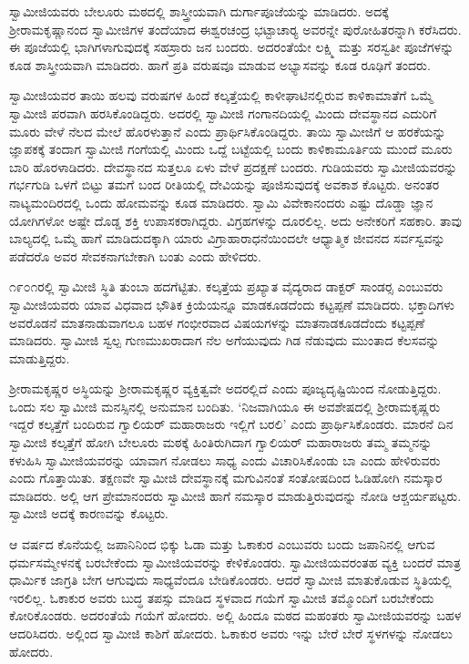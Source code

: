  ಸ್ವಾಮೀಜಿಯವರು ಬೇಲೂರು ಮಠದಲ್ಲಿ ಶಾಸ್ತ್ರೀಯವಾಗಿ ದುರ್ಗಾಪೂಜೆಯನ್ನು ಮಾಡಿದರು. ಅದಕ್ಕೆ ಶ‍್ರೀರಾಮಕೃಷ್ಣಾನಂದ ಸ್ವಾಮೀಜಿಗಳ ತಂದೆಯಾದ ಈಶ್ವರಚಂದ್ರ ಭಟ್ಟಾಚಾರ‍್ಯ ಅವರನ್ನೇ ಪುರೋಹಿತರನ್ನಾಗಿ ಕರೆಸಿದರು. ಈ ಪೂಜೆಯಲ್ಲಿ ಭಾಗಿಗಳಾಗುವುದಕ್ಕೆ ಸಹಸ್ರಾರು ಜನ ಬಂದರು. ಅದರಂತೆಯೇ ಲಕ್ಷ್ಮಿ ಮತ್ತು ಸರಸ್ವತೀ ಪೂಜೆಗಳನ್ನು ಕೂಡ ಶಾಸ್ತ್ರೀಯವಾಗಿ ಮಾಡಿದರು. ಹಾಗೆ ಪ್ರತಿ ವರುಷವೂ ಮಾಡುವ ಅಭ್ಯಾಸವನ್ನು ಕೂಡ ರೂಢಿಗೆ ತಂದರು. 

 ಸ್ವಾಮೀಜಿಯವರ ತಾಯಿ ಹಲವು ವರುಷಗಳ ಹಿಂದೆ ಕಲ್ಕತ್ತೆಯಲ್ಲಿ ಕಾಳೀಘಾಟಿನಲ್ಲಿರುವ ಕಾಳಿಕಾಮಾತೆಗೆ ಒಮ್ಮೆ ಸ್ವಾಮೀಜಿ ಪರವಾಗಿ ಹರಸಿಕೊಂಡಿದ್ದರು. ಅದರಲ್ಲಿ ಸ್ವಾಮೀಜಿ ಗಂಗಾನದಿಯಲ್ಲಿ ಮಿಂದು ದೇವಸ್ಥಾನದ ಎದುರಿಗೆ ಮೂರು ವೇಳೆ ನೆಲದ ಮೇಲೆ ಹೊರಳುತ್ತಾನೆ ಎಂದು ಪ್ರಾರ್ಥಿಸಿಕೊಂಡಿದ್ದರು. ತಾಯಿ ಸ್ವಾಮೀಜಿಗೆ ಆ ಹರಕೆಯನ್ನು ಜ್ಞಾಪಕಕ್ಕೆ ತಂದಾಗ ಸ್ವಾಮೀಜಿ ಗಂಗೆಯಲ್ಲಿ ಮಿಂದು ಒದ್ದೆ ಬಟ್ಟೆಯಲ್ಲಿ ಬಂದು ಕಾಳಿಕಾಮೂರ್ತಿಯ ಮುಂದೆ ಮೂರು ಬಾರಿ ಹೊರಳಾಡಿದರು. ದೇವಸ್ಥಾನದ ಸುತ್ತಲೂ ಏಳು ವೇಳೆ ಪ್ರದಕ್ಷಣೆ ಬಂದರು. ಗುಡಿಯವರು ಸ್ವಾಮೀಜಿಯವರನ್ನು ಗರ್ಭಗುಡಿ ಒಳಗೆ ಬಿಟ್ಟು ತಮಗೆ ಬಂದ ರೀತಿಯಲ್ಲಿ ದೇವಿಯನ್ನು ಪೂಜಿಸುವುದಕ್ಕೆ ಅವಕಾಶ ಕೊಟ್ಟರು. ಅನಂತರ ನಾಟ್ಯಮಂದಿರದಲ್ಲಿ ಒಂದು ಹೋಮವನ್ನು ಕೂಡ ಮಾಡಿದರು. ಸ್ವಾಮಿ ವಿವೇಕಾನಂದರು ಎಷ್ಟು ದೊಡ್ಡಾ ಜ್ಞಾನ ಯೋಗಿಗಳೋ ಅಷ್ಟೇ ದೊಡ್ಡ ಶಕ್ತಿ ಉಪಾಸಕರಾಗಿದ್ದರು. ವಿಗ್ರಹಗಳನ್ನು ದೂರಲಿಲ್ಲ. ಅದು ಅನೇಕರಿಗೆ ಸಹಕಾರಿ. ತಾವು ಬಾಲ್ಯದಲ್ಲಿ ಒಮ್ಮೆ ಹಾಗೆ ಮಾಡಿದುದಕ್ಕಾಗಿ ಯಾರು ವಿಗ್ರಾಹಾರಾಧನೆಯಿಂದಲೇ ಆಧ್ಯಾತ್ಮಿಕ ಜೀವನದ ಸರ್ವಸ್ವವನ್ನು ಪಡೆದರೊ ಅವರ ಸೇವಕನಾಗಬೇಕಾಗಿ ಬಂತು ಎಂದು ಹೇಳಿದರು. 

 ೧೯೦೧ರಲ್ಲಿ ಸ್ವಾಮೀಜಿ ಸ್ಥಿತಿ ತುಂಬಾ ಹದಗೆಟ್ಟಿತು. ಕಲ್ಕತ್ತೆಯ ಪ್ರಖ್ಯಾತ ವೈದ್ಯರಾದ ಡಾಕ್ಟರ್ ಸಾಂಡರ‍್ಸ ಎಂಬುವರು ಸ್ವಾಮೀಜಿಯವರು ಯಾವ ವಿಧವಾದ ಭೌತಿಕ ಕ್ರಿಯೆಯನ್ನೂ ಮಾಡಕೂಡದೆಂದು ಕಟ್ಟಪ್ಪಣೆ ಮಾಡಿದರು. ಭಕ್ತಾದಿಗಳು ಅವರೊಡನೆ ಮಾತನಾಡುವಾಗಲೂ ಬಹಳ ಗಂಭೀರವಾದ ವಿಷಯಗಳನ್ನು ಮಾತನಾಡಕೂಡದೆಂದು ಕಟ್ಟಪ್ಪಣೆ ಮಾಡಿದರು. ಸ್ವಾಮೀಜಿ ಸ್ವಲ್ಪ ಗುಣಮುಖರಾದಾಗ ನೆಲ ಅಗೆಯುವುದು ಗಿಡ ನೆಡುವುದು ಮುಂತಾದ ಕೆಲಸವನ್ನು ಮಾಡುತ್ತಿದ್ದರು. 

 ಶ‍್ರೀರಾಮಕೃಷ್ಣರ ಅಸ್ಥಿಯನ್ನು ಶ‍್ರೀರಾಮಕೃಷ್ಣರ ವ್ಯಕ್ತಿತ್ವವೇ ಅದರಲ್ಲಿದೆ ಎಂದು ಪೂಜ್ಯದೃಷ್ಟಿಯಿಂದ ನೋಡುತ್ತಿದ್ದರು. ಒಂದು ಸಲ ಸ್ವಾಮೀಜಿ ಮನಸ್ಸಿನಲ್ಲಿ ಅನುಮಾನ ಬಂದಿತು. ‘ನಿಜವಾಗಿಯೂ ಈ ಅವಶೇಷದಲ್ಲಿ ಶ‍್ರೀರಾಮಕೃಷ್ಣರು ಇದ್ದರೆ ಕಲ್ಕತ್ತೆಗೆ ಬಂದಿರುವ ಗ್ವಾಲಿಯರ್ ಮಹಾರಾಜರು ಇಲ್ಲಿಗೆ ಬರಲಿ’ ಎಂದು ಪ್ರಾರ್ಥಿಸಿಕೊಂಡರು. ಮಾರನೆ ದಿನ ಸ್ವಾಮೀಜಿ ಕಲ್ಕತ್ತೆಗೆ ಹೋಗಿ ಬೇಲೂರು ಮಠಕ್ಕೆ ಹಿಂತಿರುಗಿದಾಗ ಗ್ವಾಲಿಯರ್ ಮಹಾರಾಜರು ತಮ್ಮ ತಮ್ಮನನ್ನು ಕಳುಹಿಸಿ ಸ್ವಾಮೀಜಿಯವರನ್ನು ಯಾವಾಗ ನೋಡಲು ಸಾಧ್ಯ ಎಂದು ವಿಚಾರಿಸಿಕೊಂಡು ಬಾ ಎಂದು ಹೇಳಿರುವರು ಎಂದು ಗೊತ್ತಾಯಿತು. ತಕ್ಷಣವೇ ಸ್ವಾಮೀಜಿ ದೇವಸ್ಥಾನಕ್ಕೆ ಮಗುವಿನಂತೆ ಸಂತೋಷದಿಂದ ಓಡಿಹೋಗಿ ನಮಸ್ಕಾರ ಮಾಡಿದರು. ಅಲ್ಲಿ ಆಗ ಪ್ರೇಮಾನಂದರು ಸ್ವಾಮೀಜಿ ಹಾಗೆ ನಮಸ್ಕಾರ ಮಾಡುತ್ತಿರುವುದನ್ನು ನೋಡಿ ಆಶ್ಚರ್ಯಪಟ್ಟರು. ಸ್ವಾಮೀಜಿ ಅದಕ್ಕೆ ಕಾರಣವನ್ನು ಕೊಟ್ಟರು. 

 ಆ ವರ್ಷದ ಕೊನೆಯಲ್ಲಿ ಜಪಾನಿನಿಂದ ಭಿಕ್ಕು ಓಡಾ ಮತ್ತು ಓಕಾಕುರ ಎಂಬುವರು ಬಂದು ಜಪಾನಿನಲ್ಲಿ ಆಗುವ ಧರ್ಮಸಮ್ಮೇಳನಕ್ಕೆ ಬರಬೇಕೆಂದು ಸ್ವಾಮೀಜಿಯವರನ್ನು ಕೇಳಿಕೊಂಡರು. ಸ್ವಾಮೀಜಿಯವರಂತಹ ವ್ಯಕ್ತಿ ಬಂದರೆ ಮಾತ್ರ ಧಾರ್ಮಿಕ ಜಾಗ್ರತಿ ಬೇಗ ಆಗುವುದು ಸಾಧ್ಯವೆಂದೂ ಬೇಡಿಕೊಂಡರು. ಆದರೆ ಸ್ವಾಮೀಜಿ ಮಾತುಕೊಡುವ ಸ್ಥಿತಿಯಲ್ಲಿ ಇರಲಿಲ್ಲ. ಓಕಾಕುರ ಅವರು ಬುದ್ಧ ತಪಸ್ಸು ಮಾಡಿದ ಸ್ಥಳವಾದ ಗಯೆಗೆ ಸ್ವಾಮೀಜಿ ತಮ್ಮೊಂದಿಗೆ ಬರಬೇಕೆಂದು ಕೋರಿಕೊಂಡರು. ಅದರಂತೆಯೆ ಗಯೆಗೆ ಹೋದರು. ಅಲ್ಲಿ ಹಿಂದೂ ಮಠದ ಮಹಂತರು ಸ್ವಾಮೀಜಿಯವರನ್ನು ಬಹಳ ಆದರಿಸಿದರು. ಅಲ್ಲಿಂದ ಸ್ವಾಮೀಜಿ ಕಾಶಿಗೆ ಹೋದರು. ಓಕಾಕುರ ಅವರು ಇನ್ನು ಬೇರೆ ಬೇರೆ ಸ್ಥಳಗಳನ್ನು ನೋಡಲು ಹೋದರು. 

